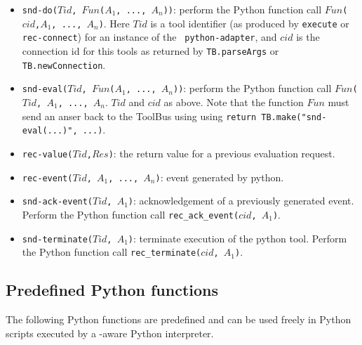 \begin{itemize}
\item {\tt snd-do($Tid$, $Fun$($A_1$, ..., $A_n$))}: perform the Python
function call
{\tt $Fun$($cid$,$A_1$, ..., $A_n$)}. Here $Tid$ is a tool identifier
(as produced by {\tt execute} or {\tt rec-connect}) for an instance of the {\tt
python-adapter}, and $cid$ is the connection id for this tools as returned
by {\tt TB.parseArgs} or {\tt TB.newConnection}.
\item {\tt snd-eval($Tid$, $Fun$($A_1$, ..., $A_n$))}: perform the Python
function call
{\tt $Fun$($Tid$, $A_1$, ..., $A_n$}. $Tid$ and $cid$ as above.
Note that the function {\tt $Fun$} must send an anser back to the
ToolBus using using {\tt return TB.make("snd-eval(...)", ...)}.
\item {\tt rec-value($Tid$,$Res$)}: the return value for a previous evaluation request.
\item {\tt rec-event($Tid$, $A_1$, ..., $A_n$)}: event generated by python.
\item {\tt snd-ack-event($Tid$, $A_1$)}: acknowledgement of
a previously generated event. Perform the Python function call
{\tt rec\_ack\_event($cid$, $A_1$)}.
\item {\tt snd-terminate($Tid$, $A_1$)}: terminate execution of the
python tool. Perform the Python function call
{\tt rec\_terminate($cid$, $A_1$)}.
\end{itemize}


\subsection{\label{Python-functions}Predefined Python functions}
The following Python functions are predefined and can be used freely in Python
scripts executed by a \TB -aware Python interpreter.

